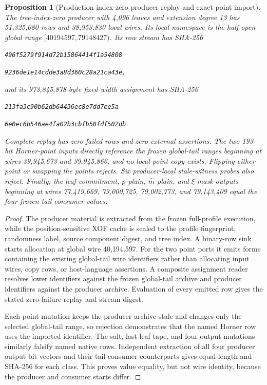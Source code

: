 \documentclass[11pt]{article}
\newtheorem{proposition}[definition]{Proposition}
\begin{document}
\begin{proposition}[Production index-zero producer replay and exact point import]
The tree-index-zero producer with 4,096 leaves and extension degree 13 has
51,325,080 rows and 38,953,830 local wires.  Its local namespace is the
half-open global range $[40194597,79148427)$.  Its row stream has SHA-256
\begin{center}\small
\texttt{496f5279f914d72b15864414f1a54808}\par\vspace{-0.2em}
\texttt{9236de1e14cdde3a8d360c28a21ca43e},
\end{center}
and its 973,845,878-byte fixed-width assignment has SHA-256
\begin{center}\small
\texttt{213fa3c90b62db64436ec8e7dd7ee5a}\par\vspace{-0.2em}
\texttt{6e0ec6b546ae4fa02b3cbfb50fdf502db}.
\end{center}
Complete replay has zero failed rows and zero external assertions.  The two
193-bit Horner-point inputs directly reference the frozen global-tail ranges
beginning at wires 39,945,673 and 39,945,866, and no local point copy exists.
Flipping either point or swapping the points rejects.  Six producer-local
stale-witness probes also reject.  Finally, the leaf-commitment,
$p$-plain, $\widehat m$-plain, and $\xi$-mask outputs beginning at wires
77,419,669, 79,000,725, 79,002,773, and 79,143,409 equal the four frozen
tail-consumer values.
\end{proposition}
\begin{proof}
The producer material is extracted from the frozen full-profile execution,
while the position-sensitive XOF cache is sealed to the profile fingerprint,
randomness label, source component digest, and tree index.  A binary-row sink
starts allocation at global wire 40,194,597.  For the two point ports it emits
forms containing the existing global-tail wire identifiers rather than
allocating input wires, copy rows, or host-language assertions.  A composite
assignment reader resolves lower identifiers against the frozen global-tail
archive and producer identifiers against the producer archive.  Evaluation of
every emitted row gives the stated zero-failure replay and stream digest.

Each point mutation keeps the producer archive stale and changes only the
selected global-tail range, so rejection demonstrates that the named Horner
row uses the imported identifier.  The salt, last-leaf tape, and four output
mutations similarly falsify named native rows.  Independent extraction of all
four producer output bit-vectors and their tail-consumer counterparts gives
equal length and SHA-256 for each class.  This proves value equality, but not
wire identity, because the producer and consumer starts differ.
\end{proof}
\end{document}
